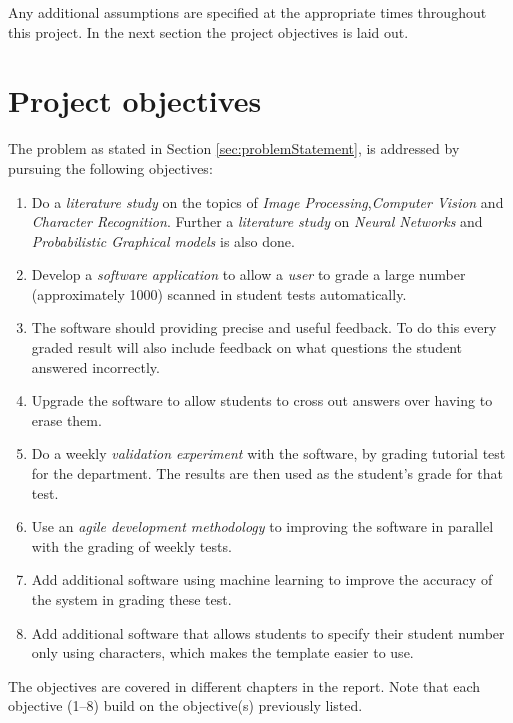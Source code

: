 Any additional assumptions are specified at the appropriate times throughout this project. In the next section the project objectives is laid out.


\section{Project objectives}
\label{sec:Objectives}

The problem as stated in Section \ref{sec:problemStatement}, is addressed by pursuing the following objectives:
\begin{enumerate}
  \item Do a \textsl{literature study} on the topics of \textsl{Image Processing},\textsl{Computer Vision} and \textsl{Character Recognition}. Further a \textsl{literature study} on \textsl{Neural Networks} and \textsl{Probabilistic Graphical models} is also done.
  \item Develop a \textsl{software application} to allow a \textsl{user} to grade a large number (approximately 1000) scanned in student tests automatically.
\item The software should providing precise and useful feedback. To do this every graded result will also include feedback on what questions the student answered incorrectly.
\item Upgrade the software to allow students to cross out answers over having to erase them.
  \item Do a weekly \textsl{validation experiment} with the software, by grading tutorial test for the department. The results are then used as the student's grade for that test.
  \item Use an \textsl{agile development methodology} to improving the software in parallel with the grading of weekly tests.
  \item Add additional software using machine learning to improve the accuracy of the system in grading these test.
  \item Add additional software that allows students to specify their student number only using characters, which makes the template easier to use.
\end{enumerate}

The objectives are covered in different chapters in the report. Note that each objective (1--8) build on the objective(s) previously listed.


